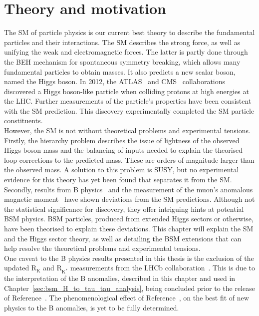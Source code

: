\chapter{Theory and motivation}
\label{sec:theory}

The \ac{SM} of particle physics is our current best theory to describe the fundamental particles and their interactions.
The \ac{SM} describes the strong force, as well as unifying the weak and electromagnetic forces.
The latter is partly done through the \ac{BEH} mechanism for spontaneous symmetry breaking, which allows many fundamental particles to obtain masses.
It also predicts a new scalar boson, named the Higgs boson.
In 2012, the ATLAS~\cite{ATLAS_Higgs_Discovery} and CMS~\cite{CMS_Higgs_Discovery} collaborations discovered a Higgs boson-like particle when colliding protons at high energies at the \ac{LHC}. 
Further measurements of the particle's properties have been consistent with the \ac{SM} prediction.
This discovery experimentally completed the \ac{SM} particle constituents. \\

However, the \ac{SM} is not without theoretical problems and experimental tensions.
Firstly, the hierarchy problem describes the issue of lightness of the observed Higgs boson mass and the  balancing of inputs needed to explain the theorised loop corrections to the predicted mass. 
These are orders of magnitude larger than the observed mass.
A solution to this problem is \ac{SUSY}, but no experimental evidence for this theory has yet been found that separates it from the \ac{SM}. 
Secondly, results from B physics~\cite{LHCb:2021trn,Kowalewski:2013mna,BaBar:2013mob,Belle:2015qfa,LHCb:2015gmp,Belle:2016dyj,LHCb:2017rln,LHCb:2017smo} and the measurement of the muon's anomalous magnetic moment~\cite{Muong-2:2006rrc,Muong-2:2021ojo} have shown deviations from the \ac{SM} predictions.
Although not the statistical significance for discovery, they offer intriguing hints at potential \ac{BSM} physics.
\ac{BSM} particles, produced from extended Higgs sectors or otherwise, have been theorised to explain these deviations.
This chapter will explain the \ac{SM} and the Higgs sector theory, as well as detailing the \ac{BSM} extensions that can help resolve the theoretical problems and experimental tensions. \\

One caveat to the B physics results presented in this thesis is the exclusion of the updated $\text{R}_{\text{K}}$ and $\text{R}_{\text{K}^{*}}$ measurements from the LHCb collaboration~\cite{LHCb:2022zom}.
This is due to the interpretation of the B anomalies, described in this chapter and used in Chapter~\ref{sec:bsm_H_to_tau_tau_analysis}, being concluded prior to the release of Reference~\cite{LHCb:2022zom}.
The phenomenological effect of Reference~\cite{LHCb:2022zom}, on the best fit of new physics to the B anomalies, is yet to be fully determined.


